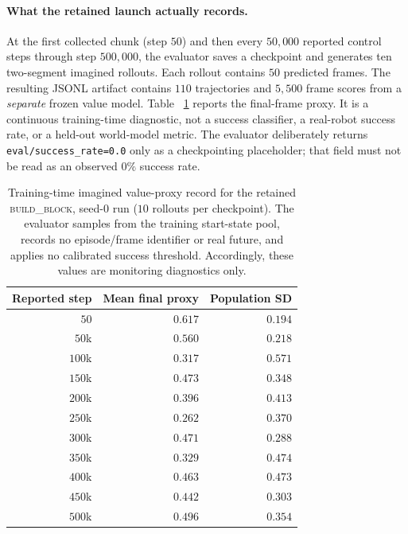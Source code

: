 \documentclass[letterpaper]{article} %
\begin{document}
\paragraph{What the retained launch actually records.}
At the first collected chunk (step $50$) and then every $50{,}000$ reported
control steps through step $500{,}000$, the evaluator saves a checkpoint and
generates ten two-segment imagined rollouts. Each rollout contains $50$
predicted frames. The resulting JSONL artifact contains $110$ trajectories and
$5{,}500$ frame scores from a \emph{separate} frozen value model. Table~
\ref{tab:block-proxy} reports the final-frame proxy. It is a continuous
training-time diagnostic, not a success classifier, a real-robot success rate,
or a held-out world-model metric. The evaluator deliberately returns
\texttt{eval/success\_rate=0.0} only as a checkpointing placeholder; that field
must not be read as an observed $0\%$ success rate.

\begin{table}[t]
\centering\small\setlength{\tabcolsep}{6pt}
\begin{tabular}{@{}rrr@{}}
\toprule
Reported step & Mean final proxy & Population SD \\
\midrule
$50$      & $0.617$ & $0.194$ \\
$50$k     & $0.560$ & $0.218$ \\
$100$k    & $0.317$ & $0.571$ \\
$150$k    & $0.473$ & $0.348$ \\
$200$k    & $0.396$ & $0.413$ \\
$250$k    & $0.262$ & $0.370$ \\
$300$k    & $0.471$ & $0.288$ \\
$350$k    & $0.329$ & $0.474$ \\
$400$k    & $0.463$ & $0.473$ \\
$450$k    & $0.442$ & $0.303$ \\
$500$k    & $0.496$ & $0.354$ \\
\bottomrule
\end{tabular}
\caption{Training-time imagined value-proxy record for the retained
\textsc{build\_block}, seed-$0$ run ($10$ rollouts per checkpoint). The
evaluator samples from the training start-state pool, records no episode/frame
identifier or real future, and applies no calibrated success threshold.
Accordingly, these values are monitoring diagnostics only.}
\label{tab:block-proxy}
\end{table}
\end{document}
